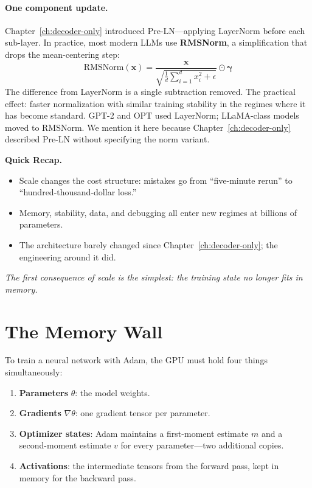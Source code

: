 \paragraph{One component update.} Chapter~\ref{ch:decoder-only} introduced Pre-LN---applying LayerNorm before each sub-layer. In practice, most modern LLMs use \textbf{RMSNorm}, a simplification that drops the mean-centering step:
\[
  \text{RMSNorm}(\mathbf{x}) = \frac{\mathbf{x}}{\sqrt{\frac{1}{d}\sum_{i=1}^{d} x_i^2 + \epsilon}} \odot \boldsymbol{\gamma}
\]
The difference from LayerNorm is a single subtraction removed. The practical effect: faster normalization with similar training stability in the regimes where it has become standard. GPT-2 and OPT used LayerNorm; LLaMA-class models moved to RMSNorm. We mention it here because Chapter~\ref{ch:decoder-only} described Pre-LN without specifying the norm variant.

\begin{quickrecap}
\textbf{Quick Recap.}
\begin{itemize}[nosep,leftmargin=1.5em]
  \item Scale changes the cost structure: mistakes go from ``five-minute rerun'' to ``hundred-thousand-dollar loss.''
  \item Memory, stability, data, and debugging all enter new regimes at billions of parameters.
  \item The architecture barely changed since Chapter~\ref{ch:decoder-only}; the engineering around it did.
\end{itemize}
\textit{The first consequence of scale is the simplest: the training state no longer fits in memory.}
\end{quickrecap}


\section{The Memory Wall}
\label{sec:memory-wall}

To train a neural network with Adam, the GPU must hold four things simultaneously:

\begin{enumerate}[nosep]
  \item \textbf{Parameters} $\theta$: the model weights.
  \item \textbf{Gradients} $\nabla\theta$: one gradient tensor per parameter.
  \item \textbf{Optimizer states}: Adam maintains a first-moment estimate $m$ and a second-moment estimate $v$ for every parameter---two additional copies.
  \item \textbf{Activations}: the intermediate tensors from the forward pass, kept in memory for the backward pass.
\end{enumerate}

